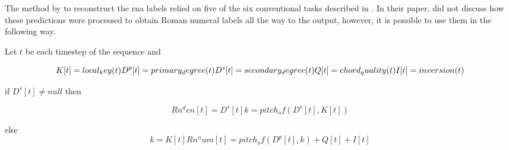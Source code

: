 
The method by \textcite{chen2018functional} to reconstruct
the \gls{rna} labels relied on five of the six conventional
tasks described in . In their
paper, \textcite{chen2018functional} did not discuss how
these predictions were processed to obtain Roman numeral
labels all the way to the output, however, it is possible to
use them in the following way.

Let $t$ be each timestep of the sequence and

\begin{equation}
K[t] = local_key(t) \\
D^p[t] = primary_degre e(t) \\
D^s[t] = secondary_degree(t)  \\
Q[t] = chord_quality(t) \\
I[t] = inversion(t) \\
\end{equation}

if $D^s[t] \neq null$ then

\begin{equation}
Rn^den[t] = D^s[t]
k = pitch_of(D^s[t], K[t])
\end{equation}

else
\begin{equation}
k = K[t]
Rn^num[t] = pitch_of(D^p[t], k) + Q[t] + I[t] 
\end{equation}
